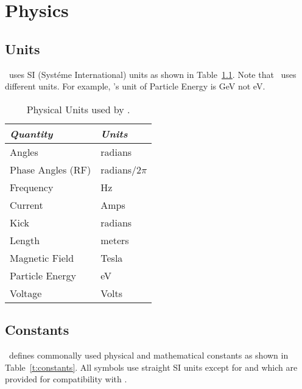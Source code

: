 \chapter{Physics}

\section{Units}

\bmad\ uses SI (Syst\'eme International) units as shown in
Table~\ref{t:units}.  Note that \mad\ uses different units. For example,
\mad's unit of Particle Energy is GeV not eV.
\begin{table}[h]
\centering
\begin{tabular}{|l|l|} \hline
  {\em Quantity}     & {\em Units}       \\ \hline
  Angles             &    radians        \\ 
  Phase Angles (RF)  &    radians/2$\pi$ \\ 
  Frequency          &    Hz             \\ 
  Current            &    Amps           \\ 
  Kick               &    radians        \\ 
  Length             &    meters         \\ 
  Magnetic Field     &    Tesla          \\ 
  Particle Energy    &    eV             \\ 
  Voltage            &    Volts          \\ \hline
\end{tabular}
\caption{Physical Units used by \bmad.}
\label{t:units}
\end{table}


\section{Constants}

\bmad\ defines commonally used physical and mathematical constants as
shown in Table~\ref{t:constants}.  All symbols use straight SI units
except for  and  which are provided for
compatibility with \mad.

